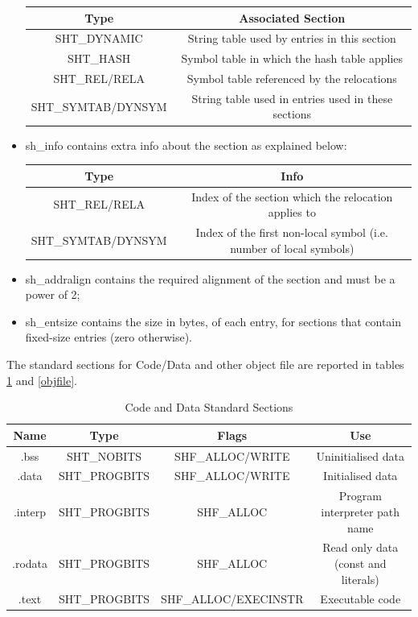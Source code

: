 \documentclass[paper=a4, fontsize=11pt]{report} %
\numberwithin{equation}{section} %
\numberwithin{figure}{section} %
\numberwithin{table}{section} %
\begin{document}
\begin{itemize}
\begin{center}
\begin{tabular}{|c|c|}
			\hline
			\textbf{Type} & \textbf{Associated Section} \\ \hline
			{\ttfamily SHT\_DYNAMIC} & String table used by entries in this 
			section\\ \hline
			{\ttfamily SHT\_HASH} & Symbol table in which the hash table 
			applies\\ \hline
			{\ttfamily SHT\_REL/RELA} & Symbol table referenced by the 
			relocations\\ \hline
			{\ttfamily SHT\_SYMTAB/DYNSYM} & String table used in entries used 
			in these sections\\ \hline
		\end{tabular}
	\end{center}
  \item {\ttfamily sh\_info} contains extra info about the section as 
	explained below:
  \begin{center}
		\begin{tabular}{|c|c|}
			\hline
			\textbf{Type} & \textbf{Info} \\ \hline
			{\ttfamily SHT\_REL/RELA} & Index of the section which the 
			relocation applies to\\ \hline
			{\ttfamily SHT\_SYMTAB/DYNSYM} & Index of the first non-local 
			symbol (i.e. number of local symbols)\\ \hline
		\end{tabular}
	\end{center}
	\item {\ttfamily sh\_addralign} contains the required alignment of the 
	section and must be a power of 2;
	\item {\ttfamily sh\_entsize} contains the size in bytes, of each entry, 
	for sections that contain fixed-size entries (zero otherwise).
\end{itemize}
The standard sections for Code/Data and other object file are reported in
tables \ref{codedata} and \ref{objfile}.
\begin{table}[!htbp]
	\begin{center}
		\begin{tabular}{|c|c|c|c|}
			\hline
			\textbf{Name} & \textbf{Type} & \textbf{Flags} & \textbf{Use}\\ 
			\hline
			{\ttfamily .bss} & {\ttfamily SHT\_NOBITS} & {\ttfamily 
			SHF\_ALLOC/WRITE} & Uninitialised data\\ \hline
			{\ttfamily .data} & {\ttfamily SHT\_PROGBITS} & {\ttfamily 
			SHF\_ALLOC/WRITE} & Initialised data\\ \hline
			{\ttfamily .interp} & {\ttfamily SHT\_PROGBITS} & {\ttfamily 
			SHF\_ALLOC} & Program interpreter path name\\ \hline
			{\ttfamily .rodata} & {\ttfamily SHT\_PROGBITS} & {\ttfamily 
			SHF\_ALLOC} & Read only data (const and literals)\\ \hline
			{\ttfamily .text} & {\ttfamily SHT\_PROGBITS} & {\ttfamily 
			SHF\_ALLOC/EXECINSTR} & Executable code\\ \hline
		\end{tabular}
		\caption{Code and Data Standard Sections}
		\label{codedata}
	\end{center}
\end{table}
\end{document}
